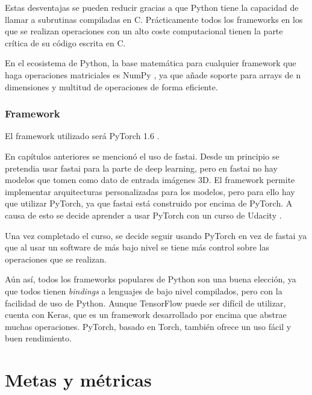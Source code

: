 Estas desventajas se pueden reducir gracias a que Python tiene la capacidad de llamar a subrutinas compiladas en C. Prácticamente todos los frameworks en los que se realizan operaciones con un alto coste computacional tienen la parte crítica de su código escrita en C.

En el ecosistema de Python, la base matemática para cualquier framework que haga operaciones matriciales es NumPy \cite{VanDerWalt2011}, ya que añade soporte para arrays de n dimensiones y multitud de operaciones de forma eficiente.

\subsubsection{Framework}\label{subsec:framework}

El framework utilizado será PyTorch 1.6 \cite{Paszke2019}.

En capítulos anteriores se mencionó el uso de fastai. Desde un principio se pretendia usar fastai para la parte de deep learning, pero en fastai no hay modelos que tomen como dato de entrada imágenes 3D. El framework permite implementar arquitecturas personalizadas para los modelos, pero para ello hay que utilizar PyTorch, ya que fastai está construido por encima de PyTorch. A causa de esto se decide aprender a usar PyTorch con un curso de Udacity \cite[Deep Learning with PyTorch]{Serrano2020}.

Una vez completado el curso, se decide seguir usando PyTorch en vez de fastai ya que al usar un software de más bajo nivel se tiene más control sobre las operaciones que se realizan.

Aún así, todos los frameworks populares de Python son una buena elección, ya que todos tienen \textit{bindings} a lenguajes de bajo nivel compilados, pero con la facilidad de uso de Python. Aunque TensorFlow puede ser difícil de utilizar, cuenta con Keras, que es un framework desarrollado por encima que abstrae muchas operaciones. PyTorch, basado en Torch, también ofrece un uso fácil y buen rendimiento.

\section{Metas y m\'etricas}\label{sec:goals_and_metrics}


